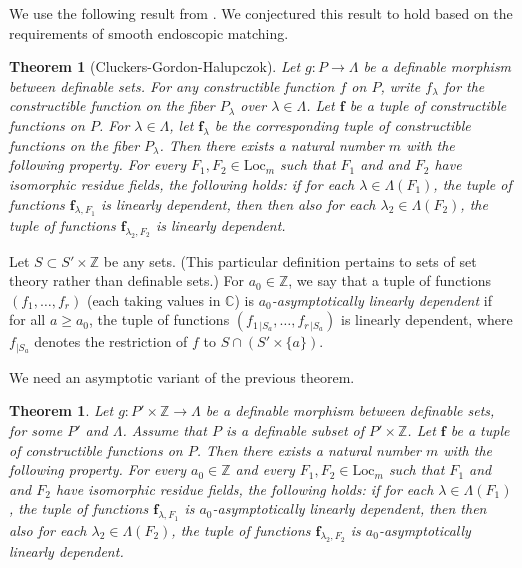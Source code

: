 \documentclass[12pt]{amsart}
\newcommand{\ring}[1]{{\mathbb #1}}
\def\bf{\mathbf f}
\newcommand{\Loc}{\mathrm{Loc}}
\theoremstyle{plain}
\newtheorem{theorem}[thm]{Theorem}
\theoremstyle{definition}
\begin{document}
We use the following result from \cite{CGH2}.  We conjectured
this result to hold based on the 
requirements of smooth endoscopic matching.

\begin{theorem}[Cluckers-Gordon-Halupczok]\label{thm:cgh}
Let $g:P\to \Lambda$ be a definable morphism between
  definable sets.  For  any constructible function $f$ on $P$, write
  $f_{\lambda}$ for the constructible function  on the fiber $P_\lambda$ over $\lambda\in
  \Lambda$.  Let $\bf$ be a tuple of constructible
  functions on $P$. For $\lambda\in \Lambda$, let $\bf_\lambda$ be the corresponding tuple
  of constructible functions on the fiber $P_\lambda$.  Then there exists a
  natural number $m$ with the following property.  For every $F_1,F_2 \in
  \Loc_{m}$ such that $F_1$ and and $F_2$ have isomorphic residue
  fields, the following holds: if for each $\lambda\in \Lambda({F_1})$, the tuple of
  functions $\bf_{\lambda,F_1}$ is linearly dependent, then then also for each
  $\lambda_2\in \Lambda({F_2})$, the tuple of functions $\bf_{\lambda_2,F_2}$ is linearly
  dependent.
\end{theorem}

Let $S \subset S'\times\ring{Z}$ be any sets.  (This particular
definition pertains to sets of set theory rather than definable sets.)
For $a_0\in\ring{Z}$, we say that a tuple of functions
$(f_1,\ldots,f_r)$ (each taking values in $\ring{C}$) is {\it
  $a_0$-asymptotically linearly dependent} if for all $a\ge a_0$, the
tuple of functions $(f_{1\,|S_a},\ldots,f_{r\,|S_a})$ is linearly
dependent, where $f_{|S_a}$ denotes the restriction of $f$ to $S\cap
(S'\times\{a\})$.

We need an asymptotic variant of the previous theorem.


\begin{theorem}\label{thm:cgh-asymp}
  Let $g:P'\times\ring{Z}\to \Lambda$ be a definable morphism between
  definable sets, for some $P'$ and $\Lambda$.  Assume that $P$ is a
  definable subset of $P'\times\ring{Z}$.  Let $\bf$ be a tuple of
  constructible functions on $P$.  Then there exists a natural number
  $m$ with the following property.  For every $a_0\in\ring{Z}$ and
  every $F_1,F_2 \in \Loc_{m}$ such that $F_1$ and and $F_2$ have
  isomorphic residue fields, the following holds: if for each
  $\lambda\in \Lambda({F_1})$, the tuple of functions
  $\bf_{\lambda,F_1}$ is $a_0$-asymptotically linearly dependent, then
  then also for each $\lambda_2\in \Lambda({F_2})$, the tuple of
  functions $\bf_{\lambda_2,F_2}$ is $a_0$-asymptotically linearly
  dependent.
\end{theorem}
\end{document}

